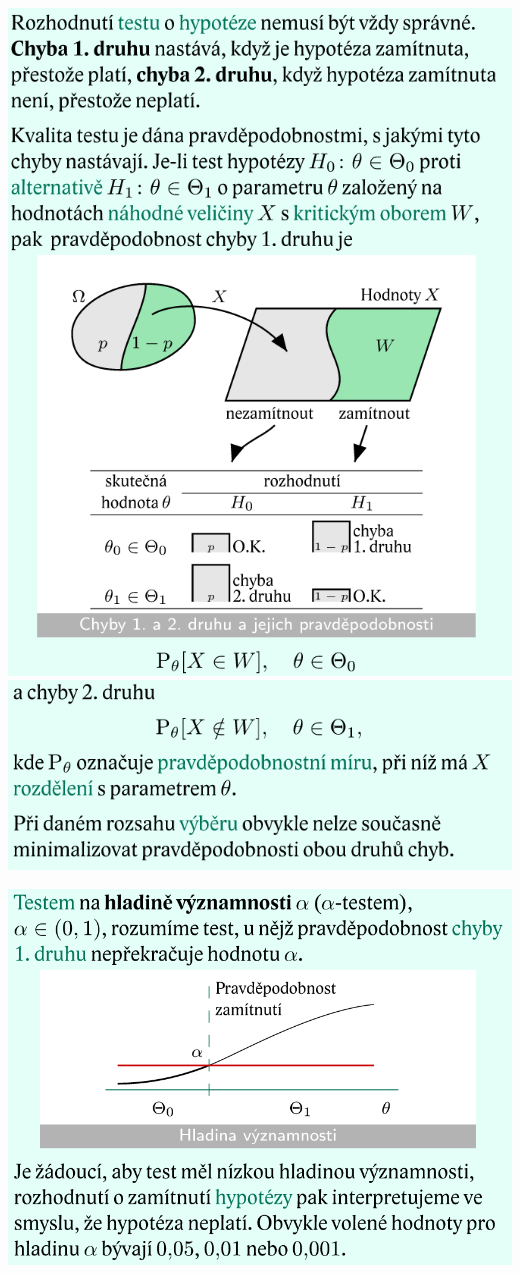 \documentclass[12pt,a4paper]{article}
\begin{document}
\begin{center}
	\includegraphics[scale=0.55]{img/testovani_hypotez_4a}
	\includegraphics[scale=0.55]{img/testovani_hypotez_4b}
\end{center}
	\includegraphics[scale=0.4]{img/testovani_hypotez_5}
\end{document}
